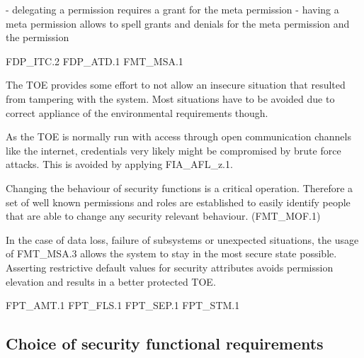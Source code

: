 \documentclass[10pt,a4paper,english]{scrbook}
\begin{document}

    - delegating a permission requires a grant for the meta permission
    - having a meta permission allows to spell grants and denials for the meta permission and the permission
    
    FDP\_ITC.2
    FDP\_ATD.1
    FMT\_MSA.1



    The TOE provides some effort to not allow an insecure situation that
    resulted from tampering with the system. Most situations have to be avoided
    due to correct appliance of the environmental requirements though.

    As the TOE is normally run with access through open communication channels
    like the internet, credentials very likely might be compromised by brute
    force attacks. This is avoided by applying FIA\_AFL\_z.1.

    Changing the behaviour of security functions is a critical operation.
    Therefore a set of well known permissions and roles are established to
    easily identify people that are able to change any security relevant
    behaviour. (FMT\_MOF.1)
    
    In the case of data loss, failure of subsystems or unexpected situations,
    the usage of FMT\_MSA.3 allows the system to stay in the most secure state
    possible. Asserting restrictive default values for security attributes
    avoids permission elevation and results in a better protected TOE.
    
    FPT\_AMT.1
    FPT\_FLS.1
    FPT\_SEP.1
    FPT\_STM.1






\hypertarget{choice-of-security-functional-requirements}{}
\subsection{Choice of security functional requirements}
\end{document}
